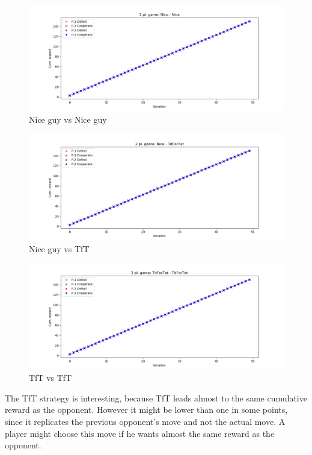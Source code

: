 \documentclass[journal,a4paper,10pt,twoside,draft]{IEEEtran}
\begin{document}
\begin{figure}
    \centering
    \includegraphics[width=1\columnwidth]{../img_v1/idp2p-rewards-Nice-Nice.png}
    \caption{Nice guy vs Nice guy}
    \label{fig:nicevsnice}
\end{figure}

\begin{figure}
    \centering
    \includegraphics[width=1\columnwidth]{../img_v1/idp2p-rewards-Nice-TitForTat.png}
    \caption{Nice guy vs TfT}
    \label{fig:nicevstft}
\end{figure}

\begin{figure}
    \centering
    \includegraphics[width=1\columnwidth]{../img_v1/idp2p-rewards-TitForTat-TitForTat.png}
    \caption{TfT vs TfT}
    \label{fig:tftvstft}
\end{figure}

The TfT strategy is interesting, because TfT leads almost to the same cumulative reward as the opponent. However it might be lower than one in some points, since it replicates the previous opponent's move and not the actual move. A player might choose this move if he wants almost the same reward as the opponent.
\end{document}
